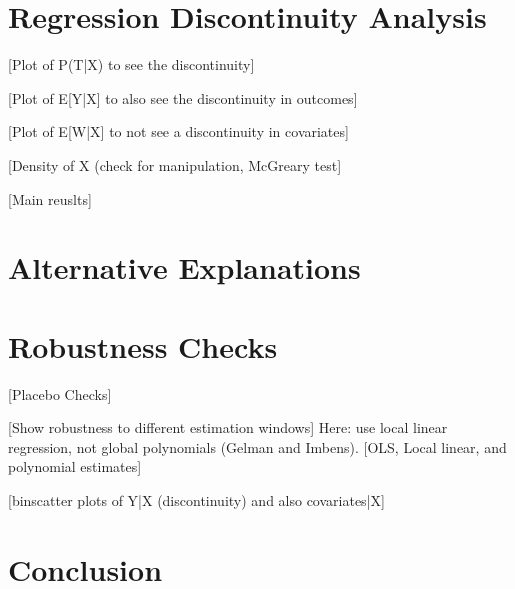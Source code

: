 \documentclass[12pt]{article}
\begin{document}
\section{Regression Discontinuity Analysis}

[Plot of P(T|X) to see the discontinuity]

[Plot of E[Y|X] to also see the discontinuity in outcomes]

[Plot of E[W|X] to not see a discontinuity in covariates]

[Density of X (check for manipulation, McGreary test]

[Main reuslts]

\section{Alternative Explanations}\label{sec:altexp}



\section{Robustness Checks}

    [Placebo Checks]

    [Show robustness to different estimation windows]
    Here: use local linear regression, not global polynomials (Gelman and Imbens).
    [OLS, Local linear, and polynomial estimates]

    [binscatter plots of Y|X (discontinuity) and also covariates|X]

\section{Conclusion}

\newpage

\end{document}
